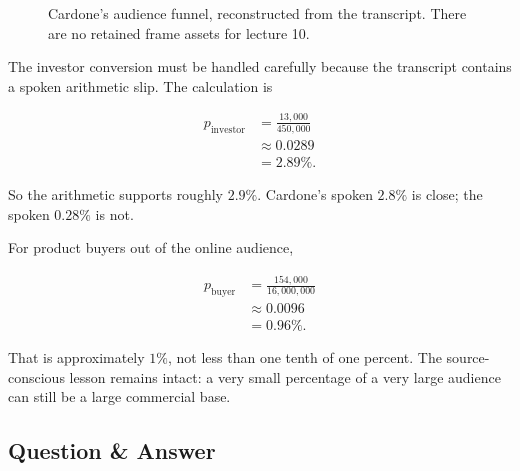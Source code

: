 \documentclass[11pt,oneside]{book}
\begin{document}
\begin{figure}
\centering
{}
\caption{Cardone's audience funnel, reconstructed from the transcript. There are no retained frame assets for lecture 10.}
\end{figure}

The investor conversion must be handled carefully because the transcript contains a spoken arithmetic slip. The calculation is

\begin{align}
p_{\mathrm{investor}}
&=
\frac{13{,}000}{450{,}000}\\
&\approx 0.0289\\
&=2.89\%.
\end{align}

So the arithmetic supports roughly \(2.9\%\). Cardone's spoken \(2.8\%\) is close; the spoken \(0.28\%\) is not.

For product buyers out of the online audience,

\begin{align}
p_{\mathrm{buyer}}
&=
\frac{154{,}000}{16{,}000{,}000}\\
&\approx 0.0096\\
&=0.96\%.
\end{align}

That is approximately \(1\%\), not less than one tenth of one percent. The source-conscious lesson remains intact: a very small percentage of a very large audience can still be a large commercial base.

\subsection{Question \& Answer}
\end{document}

